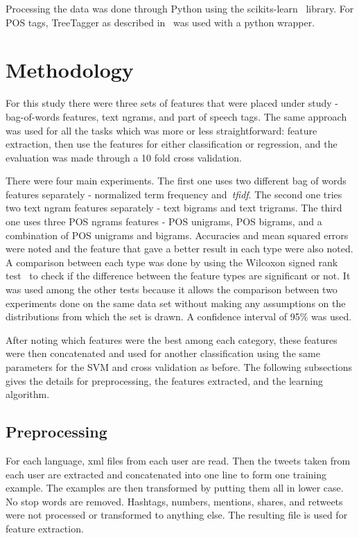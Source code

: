 \documentclass[a4paper]{llncs}
\begin{document}
Processing the data was done through Python using the scikits-learn~\cite{scikit-learn} library. For POS tags, TreeTagger as described in~\cite{schmid1994probabilistic} was used with a python wrapper. 

\section{Methodology}
For this study there were three sets of features that were placed under study - bag-of-words features, text ngrams, and  part of speech tags. The same approach was used for all the tasks which was more or less straightforward: feature extraction, then use the features for either classification or regression, and the evaluation was made through a 10 fold cross validation.

There were four main experiments. The first one uses two different bag of words features separately - normalized term frequency and~\textit{tfidf}. The second one tries two text ngram features separately - text bigrams and text trigrams. The third one uses three POS ngrams features - POS unigrams, POS bigrams, and a combination of POS unigrams and bigrams. Accuracies and mean squared errors were noted and the feature that gave a better result in each type were also noted. A comparison between each type was done by using the Wilcoxon signed rank test~\cite{wilcoxon1945individual} to check if the difference between the feature types are significant or not. It was used among the other tests because it allows the comparison between two experiments done on the same data set without making any assumptions on the distributions from which the set is drawn. A confidence interval of 95\% was used.

After noting which features were the best among each category, these features were then concatenated and used for another classification using the same parameters for the SVM and cross validation as before. The following subsections gives the details for preprocessing, the features extracted, and the learning algorithm.
\subsection{Preprocessing}
For each language, xml files from each user are read. Then the tweets taken from each user are extracted and concatenated into one line to form one training example. The examples are then transformed by putting them all in lower case. No stop words are removed. Hashtags, numbers, mentions, shares, and retweets were not processed or transformed to anything else. The resulting file is used for feature extraction.  
\end{document}
